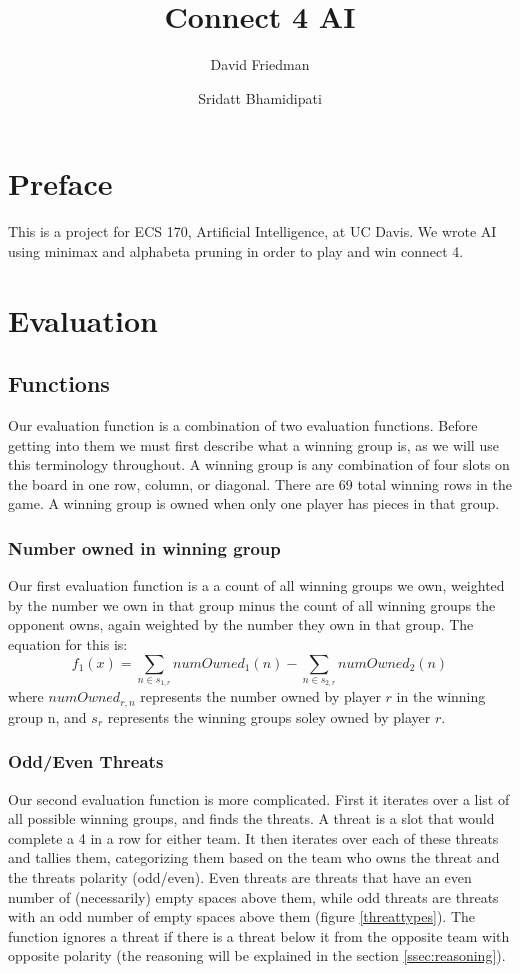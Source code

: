\documentclass{article}
\title{Connect 4 AI}
\author{David Friedman \and Sridatt Bhamidipati}
\begin{document}
\maketitle
\newpage
\tableofcontents
\newpage

\section{Preface}
This is a project for ECS 170, Artificial Intelligence, at UC Davis. We wrote AI using minimax and alphabeta pruning in order to play and win connect 4.
	
\section{Evaluation}
\subsection{Functions}
Our evaluation function is a combination of two evaluation functions. Before getting into them we must first describe what a winning group is, as we will use this terminology throughout. A winning group is any combination of four slots on the board in one row, column, or diagonal. There are 69 total winning rows in the game. A winning group is owned when only one player has pieces in that group.
\subsubsection{Number owned in winning group}
Our first evaluation function is a a count of all winning groups we own, weighted by the number we own in that group minus the count of all winning groups the opponent owns, again weighted by the number they own in that group. The equation for this is:
\[f_1(x)=\sum_{n \in s_{1,r}}{numOwned_1(n)}-\sum_{n \in s_{2,r}}{numOwned_2(n)}\]
where $numOwned_{r,n}$ represents the number owned by player $r$ in the winning group n, and $s_r$ represents the winning groups soley owned by player $r$.
\subsubsection{Odd/Even Threats}
\label{oddeven}
Our second evaluation function is more complicated. First it iterates over a list of all possible winning groups, and finds the threats. A threat is a slot that would complete a 4 in a row for either team. It then iterates over each of these threats and tallies them, categorizing them based on the team who owns the threat and the threats polarity (odd/even). Even threats are threats that have an even number of (necessarily) empty spaces above them, while odd threats are threats with an odd number of empty spaces above them (figure \ref{threattypes}). The function ignores a threat if there is a threat below it from the opposite team with opposite polarity (the reasoning will be explained in the section \ref{ssec:reasoning}). 
		
\end{document}

